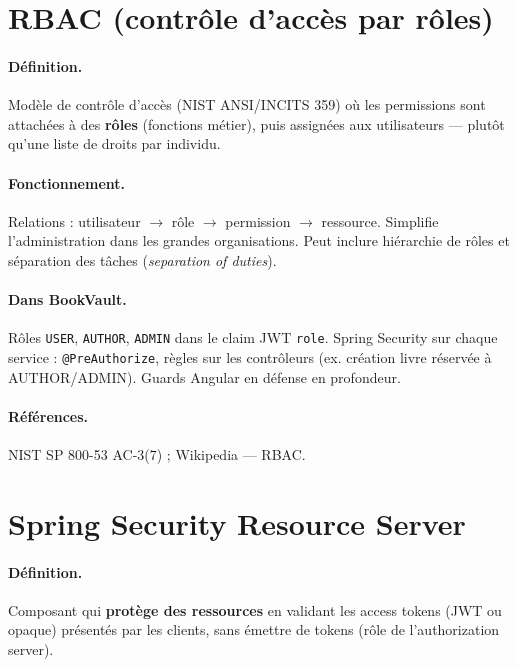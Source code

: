 \documentclass[12pt,a4paper]{report}
\begin{document}
\section{RBAC (contrôle d'accès par rôles)}

\paragraph{Définition.} Modèle de contrôle d'accès (NIST ANSI/INCITS 359) où les permissions sont attachées à des \textbf{rôles} (fonctions métier), puis assignées aux utilisateurs — plutôt qu'une liste de droits par individu.\par

\paragraph{Fonctionnement.} Relations : utilisateur $\rightarrow$ rôle $\rightarrow$ permission $\rightarrow$ ressource. Simplifie l'administration dans les grandes organisations. Peut inclure hiérarchie de rôles et séparation des tâches (\textit{separation of duties}).\par

\paragraph{Dans BookVault.} Rôles \texttt{USER}, \texttt{AUTHOR}, \texttt{ADMIN} dans le claim JWT \texttt{role}. Spring Security sur chaque service : \texttt{@PreAuthorize}, règles sur les contrôleurs (ex. création livre réservée à AUTHOR/ADMIN). Guards Angular en défense en profondeur.\par

\paragraph{Références.} NIST SP 800-53 AC-3(7) ; Wikipedia — RBAC.\par


\section{Spring Security Resource Server}

\paragraph{Définition.} Composant qui \textbf{protège des ressources} en validant les access tokens (JWT ou opaque) présentés par les clients, sans émettre de tokens (rôle de l'authorization server).\par
\end{document}
